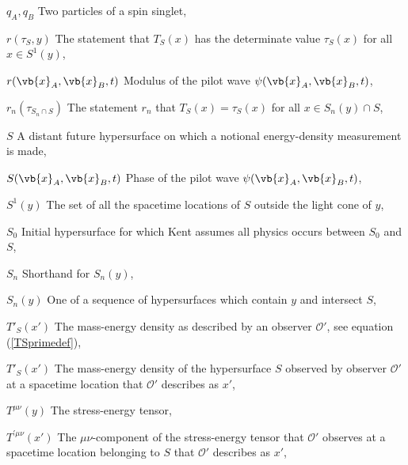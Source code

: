 \begin{thenomenclature}
  \item [{$q_A, q_B$}]\begingroup Two particles of a spin singlet, \nomrefpage{}
  \item [{$r(\tau_S, y)$}]\begingroup The statement that $T_S(x)$ has the determinate value $\tau_S(x)$ for all $x\in S^1(y)$, \nomrefpage{}
  \item [{$r(\vb{x}_A, \vb{x}_B, t)$}]\begingroup Modulus of the pilot wave $\psi(\vb{x}_A, \vb{x}_B, t)$, \nomrefpage{}
  \item [{$r_n(\tau_{S_n\cap S})$}]\begingroup The statement $r_n$  that $T_S(x)=\tau_S(x)$ for all $x\in S_n(y)\cap S$,  \nomrefpage{}
  \item [{$S$}]\begingroup A distant future hypersurface on which a notional energy-density measurement is made, \nomrefpage{}
  \item [{$S(\vb{x}_A, \vb{x}_B,t )$}]\begingroup Phase of the pilot wave $\psi(\vb{x}_A, \vb{x}_B, t)$, \nomrefpage{}
  \item [{$S^1(y)$}]\begingroup The set  of all the spacetime locations of $S$ outside the light cone of $y$, \nomrefpage{}
  \item [{$S_0$}]\begingroup Initial hypersurface for which Kent assumes all physics occurs between $S_0$ and $S$, \nomrefpage{}
  \item [{$S_n$}]\begingroup Shorthand for $S_n(y)$, \nomrefpage{}
  \item [{$S_n(y)$}]\begingroup One of a sequence of hypersurfaces which contain $y$ and intersect $S$, \nomrefpage{}
  \item [{$T'_S(x')$}]\begingroup The mass-energy density as described by an observer $\mathcal{O}'$, see equation (\ref{TSprimedef}), \nomrefpage{}
  \item [{$T'_S(x')$}]\begingroup The mass-energy density of the hypersurface $S$ observed by observer $\mathcal{O}'$ at a spacetime location that $\mathcal{O}'$ describes as $x'$, \nomrefpage{}
  \item [{$T^{\mu\nu}(y)$}]\begingroup The stress-energy tensor, \nomrefpage{}
  \item [{$T^{\prime\mu\nu}(x')$}]\begingroup The $\mu\nu$-component of the stress-energy tensor that $\mathcal{O}'$ observes at a spacetime location  belonging to $S$ that $\mathcal{O}'$ describes as $x'$, \nomrefpage{}

\end{thenomenclature}
